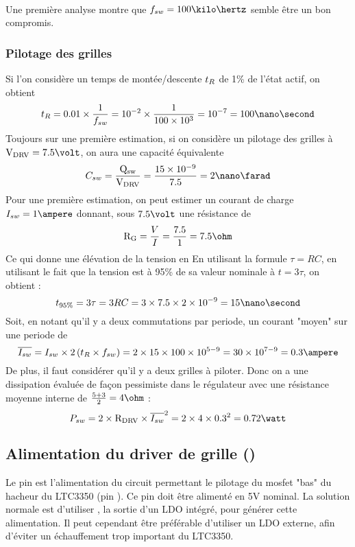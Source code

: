 \paragraph{}
Une première analyse  montre que $\fsw = 100\kilo\hertz$ semble être un bon compromis.

\subsubsection{Pilotage des grilles}
Si l'on considère un temps de montée/descente $\mathnormal{t_{R}}$ de 1\% de l'état actif, on obtient 
$$\trise = 0.01 \times \frac{1}{\fsw} = 10^{-2} \times \frac{1}{100\times10^{3}} = 10^{-7} = 100 \nano\second$$
Toujours sur une première estimation, si on considère un pilotage des grilles à $\vdrv = 7.5\volt$, on aura une capacité équivalente
$$\csw = \frac{\qsw}{\vdrv} = \frac{15\times10^{-9}}{7.5} = 2\nano\farad$$
Pour une première estimation, on peut estimer un courant de charge $ \isw = 1 \ampere$ donnant, sous $7.5 \volt$ une résistance \rgate de 
$$\rgate = \frac{V}{I} = \frac{7.5}{1} = 7.5\ohm$$
Ce qui donne une élévation de la tension en \trise 
En utilisant la formule $\tau = RC$, en utilisant le fait que la tension est à 95\% de sa valeur nominale à $t = 3\tau$, on obtient :
$$t_{95\%} = 3\tau = 3RC = 3\times 7.5 \times 2\times10^{-9} = 15\nano\second $$
Soit, en notant qu'il y a deux commutations par periode, un courant "moyen" sur une periode de 
$$\iswavg = \isw \times 2\left(\trise \times \fsw\right) = 2 \times {15\times 100\times 10^{5-9}} = 30 \times 10^{7-9} = 0.3\ampere $$
De plus, il faut considérer qu'il y a deux grilles à piloter.
Donc on a une dissipation \psw évaluée de façon pessimiste dans le régulateur avec une résistance \rdrv moyenne interne de $\frac{5+3}{2} = 4\ohm$ :
$$\psw = 2\times \rdrv \times \iswavg^2 = 2\times 4 \times 0.3^2 = 0.72 \watt$$





\subsection{Alimentation du driver de grille (\drvcc)}
Le pin \drvcc est l'alimentation du circuit permettant le pilotage du mosfet "bas" du hacheur du LTC3350 (pin \bgate).
Ce pin doit être alimenté en 5V nominal. La solution normale est d'utiliser \intvcc, la sortie d'un LDO intégré, pour générer cette alimentation.
Il peut cependant être préférable d'utiliser un LDO externe, afin d'éviter un échauffement trop important du LTC3350.

